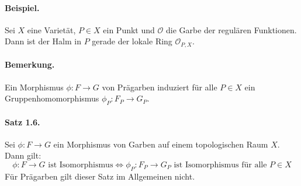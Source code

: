 \documentclass[11pt,b5paper,openany]{memoir}
\begin{document}
\paragraph{Beispiel.} Sei $X$ eine Varietät, $P\in X$ ein Punkt und $\mathcal{O}$ die Garbe der regulären Funktionen. Dann ist der Halm in $P$ gerade der lokale Ring $\mathcal{O}_{P,X}$.

\paragraph{Bemerkung.} Ein Morphismus $\phi:F\to G$ von Prägarben induziert für alle $P\in X$ ein Gruppenhomomorphismus $\phi_P:F_P\to G_P$.

\paragraph{Satz 1.6.}\label{1.6} Sei $\phi:F\to G$ ein Morphismus von Garben auf einem topologischen Raum $X$. Dann gilt:
\[\phi:F\to G\text{ ist Isomorphismus}\iff \phi_P:F_P\to G_P\text{ ist Isomorphismus für alle }P\in X \]
Für Prägarben gilt dieser Satz im Allgemeinen nicht.
\end{document}
